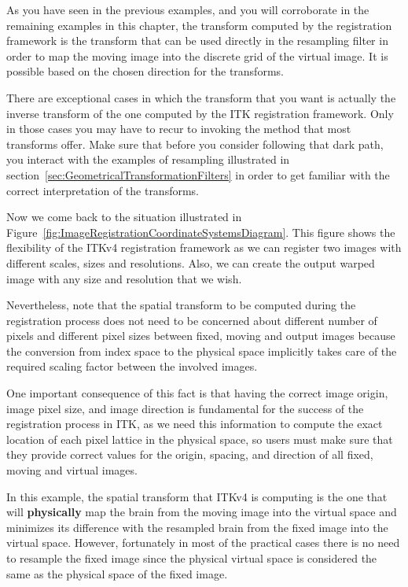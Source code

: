 As you have seen in the previous examples, and you will corroborate in the remaining
examples in this chapter, the transform computed by the registration framework
is the transform that can be used directly in the resampling filter in order to
map the moving image into the discrete grid of the virtual image. It is possible
based on the chosen direction for the transforms.

There are exceptional cases in which the transform that you want is actually the
inverse transform of the one computed by the ITK registration framework. Only
in those cases you may have to recur to invoking the  method that
most transforms offer. Make sure that before you consider following that dark
path, you interact with the examples of resampling illustrated in
section~\ref{sec:GeometricalTransformationFilters} in order to get familiar
with the correct interpretation of the transforms.

Now we come back to the situation illustrated in
Figure~\ref{fig:ImageRegistrationCoordinateSystemsDiagram}. This figure shows
the flexibility of the ITKv4 registration framework as we can register two
images with different scales, sizes and resolutions. Also, we can create the
output warped image with any size and resolution that we wish.

Nevertheless, note that the spatial transform to be computed during the
registration process does not need to be concerned about different number
of pixels and different pixel sizes between fixed, moving and output images
because the conversion from index space to the physical space implicitly
takes care of the required scaling factor between the involved images.

One important consequence of this fact is that having the correct image origin,
image pixel size, and image direction is fundamental for the success of the
registration process in ITK, as we need this information to compute the exact
location of each pixel lattice in the physical space, so users must make sure
that they provide correct values for the origin, spacing, and direction of all
fixed, moving and virtual images.

In this example, the spatial transform that ITKv4 is computing is the one that
will \textbf{physically} map the brain from the moving image into the virtual space and
minimizes its difference with the resampled brain from the fixed image into the
virtual space. However, fortunately in most of the practical cases there is no
need to resample the fixed image since the physical virtual space is considered
the same as the physical space of the fixed image.

